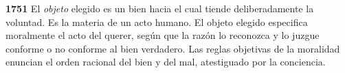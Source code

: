\textbf{1751} El \emph{objeto} elegido es un bien hacia el cual tiende deliberadamente la voluntad. Es la materia de un acto humano. El objeto elegido especifica moralmente el acto del querer, según que la razón lo reconozca y lo juzgue conforme o no conforme al bien verdadero. Las reglas objetivas de la moralidad enuncian el orden racional del bien y del mal, atestiguado por la conciencia.
